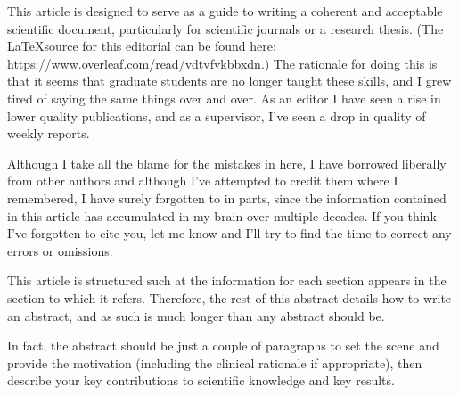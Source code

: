 


This article is designed to serve as a guide to writing a coherent and acceptable scientific document, particularly for scientific journals or a research thesis. (The \LaTeX source for this editorial can be found here: \url{https://www.overleaf.com/read/vdtvfvkbbxdn}.) The rationale for doing this is that it seems that graduate students are no longer taught these skills, and I grew tired of saying the same things over and over. As an editor I have seen a rise in lower quality publications, and as a supervisor, I've seen a drop in quality of weekly reports. 

Although I take all the blame for the mistakes in here, I have borrowed liberally from other authors and although I've attempted to credit them where I remembered, I have surely forgotten to in parts, since the information contained in this article has accumulated in my brain over multiple decades. If you think I've forgotten to cite you, let me know and I'll try to find the time to correct any errors or omissions. 


This article is structured such at the information for each section appears in the section to which it refers. Therefore, the rest of this abstract details how to write an abstract, and as such is much longer than any abstract should be. 

In fact, the abstract should be just a couple of paragraphs to set the scene and provide the motivation (including the clinical rationale if appropriate), then describe your key contributions to scientific knowledge and key results.

